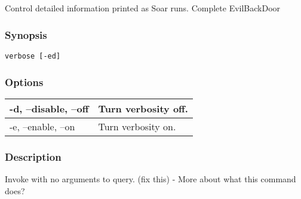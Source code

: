 \subsection{}
\label{verbose}
Control detailed information printed as Soar runs. 
 Complete EvilBackDoor
\subsubsection*{Synopsis}
\begin{verbatim}
verbose [-ed]
\end{verbatim}
\subsubsection*{Options}
\begin{tabular}{|l|l|}
\hline 
 -d, --disable, --off  & Turn verbosity off.  \\
 \hline 
 -e, --enable, --on  & Turn verbosity on.  \\
 \hline 
\end{tabular}
\subsubsection*{Description}
 Invoke with no arguments to query. (fix this) - More about what this command does? 
